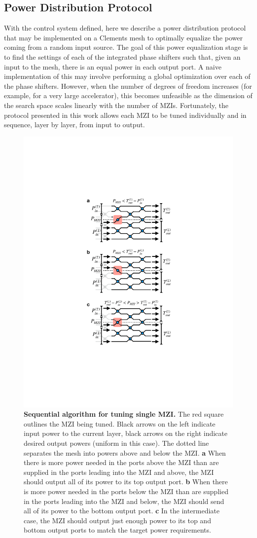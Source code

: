 \subsection{\label{sec:algo}Power Distribution Protocol}

With the control system defined, here we describe a power distribution protocol that may be implemented on a Clements mesh to optimally equalize the power coming from a random input source.  The goal of this power equalization stage is to find the settings of each of the integrated phase shifters such that, given an input to the mesh, there is an equal power in each output port.  A naive implementation of this may involve performing a global optimization over each of the phase shifters.  However, when the number of degrees of freedom increases (for example, for a very large accelerator), this becomes unfeasible as the dimension of the search space scales linearly with the number of MZIs. Fortunately, the protocol presented in this work allows each MZI to be tuned individually and in sequence, layer by layer, from input to output.

\begin{figure}[htp]
\centering
\includegraphics[width=0.6\columnwidth]{figures/MZI_tune}
\caption{\label{fig:algo} \textbf{Sequential algorithm for tuning single MZI.} The red square outlines the MZI being tuned.  Black arrows on the left indicate input power to the current layer, black arrows on the right indicate desired output powers (uniform in this case).  The dotted line separates the mesh into powers above and below the MZI.  \textbf{a} When there is more power needed in the ports above the MZI than are supplied in the ports leading into the MZI and above, the MZI should output all of its power to its top output port. \textbf{b} When there is more power needed in the ports below the MZI than are supplied in the ports leading into the MZI and below, the MZI should send all of its power to the bottom output port.  \textbf{c} In the intermediate case, the MZI should output just enough power to its top and bottom output ports to match the target power requirements.}
\end{figure}

